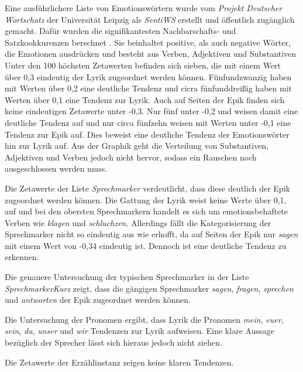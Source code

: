 \documentclass[a4paper,10p]{article}
\begin{document}
Eine ausführlichere Liste von Emotionswörtern wurde vom \textit{Projekt Deutscher Wortschatz} der Universität Leipzig als \textit{SentiWS} erstellt und öffentlich zugänglich gemacht. Dafür wurden die signifikantesten Nachbarschafts- und Satzkookkurenzen berechnet \citep{Sentiws}. Sie beinhaltet positive, als auch negative Wörter, die Emotionen ausdrücken und besteht aus Verben, Adjektiven und Substantiven \citep[vgl.]{Remus} Unter den 100 höchsten Zetawerten befinden sich sieben, die mit einem Wert über 0,3 eindeutig der Lyrik zugeordnet werden können. Fünfundzwanzig haben mit Werten über 0,2 eine deutliche Tendenz und cicra fünfunddreißig haben mit Werten über 0,1 eine Tendenz zur Lyrik. Auch auf Seiten der Epik finden sich keine eindeutigen Zetawerte unter -0,3. Nur fünf unter -0,2 und weisen damit eine deutliche Tendenz auf und nur circa fünfzehn weisen mit Werten unter -0,1 eine Tendenz zur Epik auf. Dies beweist eine deutliche Tendenz der Emotionswörter hin zur Lyrik auf. Aus der Graphik geht die Verteilung von Substantiven, Adjektiven und Verben jedoch nicht hervor, sodass ein Rauschen noch ausgeschlossen werden muss. \par 

Die Zetawerte der Liste \textit{Sprechmarker} verdeutlicht, dass diese deutlich der Epik zugeordnet werden können. Die Gattung der Lyrik weist keine Werte über 0,1, auf und bei den obersten Sprechmarkern handelt es sich um emotionsbehaftete Verben wie \textit{klagen} und \textit{schluchzen}. Allerdings fällt die Kategorisierung der Sprechmarker nicht so eindeutig aus wie erhofft, da auf Seiten der Epik nur \textit{sagen} mit einem Wert von -0,34 eindeutig ist. Dennoch ist eine deutliche Tendenz zu erkennen. \par 

Die genauere Untersuchung der typischen Sprechmarker in der Liste \textit{SprechmarkerKurz} zeigt, dass die gängigen Sprechmarker \textit{sagen}, \textit{fragen}, \textit{sprechen} und \textit{antworten} der Epik zugeordnet werden können. \par 

Die Untersuchung der Pronomen ergibt, dass Lyrik die Pronomen \textit{mein}, \textit{euer}, \textit{sein}, \textit{du}, \textit{unser} und \textit{wir} Tendenzen zur Lyrik aufweisen. Eine klare Aussage bezüglich der Sprecher lässt sich hieraus jedoch nicht ziehen. \par 

Die Zetawerte der Erzählinstanz zeigen keine klaren Tendenzen. \par
\end{document}
